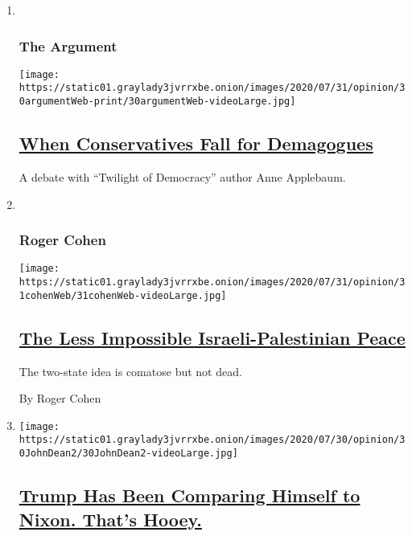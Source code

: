 \begin{enumerate}
\def\labelenumi{\arabic{enumi}.}
\item ~
  \hypertarget{the-argument}{%
  \subsubsection{The Argument}\label{the-argument}}

  \texttt{[image: https://static01.graylady3jvrrxbe.onion/images/2020/07/31/opinion/30argumentWeb-print/30argumentWeb-videoLarge.jpg]}

  \hypertarget{when-conservatives-fall-for-demagogues}{%
  \subsection{\texorpdfstring{\href{/2020/07/30/opinion/the-argument-authoritarianism-anne-applebaum.html}{When
  Conservatives Fall for
  Demagogues}}{When Conservatives Fall for Demagogues}}\label{when-conservatives-fall-for-demagogues}}

  A debate with ``Twilight of Democracy'' author Anne Applebaum.
\item ~
  \hypertarget{roger-cohen}{%
  \subsubsection{Roger Cohen}\label{roger-cohen}}

  \texttt{[image: https://static01.graylady3jvrrxbe.onion/images/2020/07/31/opinion/31cohenWeb/31cohenWeb-videoLarge.jpg]}

  \hypertarget{the-less-impossible-israeli-palestinian-peace}{%
  \subsection{\texorpdfstring{\href{/2020/07/31/opinion/israeli-palestinian-peace.html}{The
  Less Impossible Israeli-Palestinian
  Peace}}{The Less Impossible Israeli-Palestinian Peace}}\label{the-less-impossible-israeli-palestinian-peace}}

  The two-state idea is comatose but not dead.

  By Roger Cohen
\item
  \texttt{[image: https://static01.graylady3jvrrxbe.onion/images/2020/07/30/opinion/30JohnDean2/30JohnDean2-videoLarge.jpg]}

  \hypertarget{trump-has-been-comparing-himself-to-nixon-thats-hooey}{%
  \subsection{\texorpdfstring{\href{/2020/07/31/opinion/trump-nixon-authoritarianism.html}{Trump
  Has Been Comparing Himself to Nixon. That's
  Hooey.}}{Trump Has Been Comparing Himself to Nixon. That's Hooey.}}\label{trump-has-been-comparing-himself-to-nixon-thats-hooey}}


\end{enumerate}
